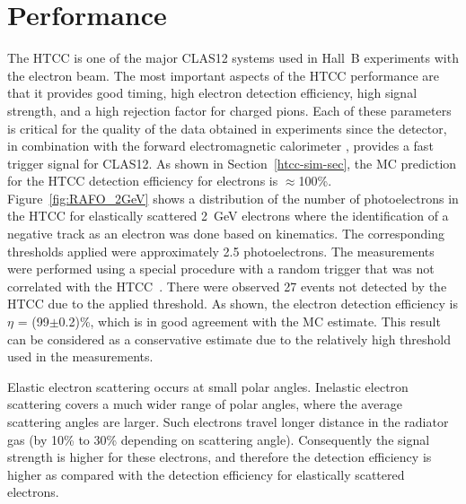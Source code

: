 \section{Performance}

The HTCC is one of the major CLAS12 systems used in Hall~B experiments with the electron beam. The most important
aspects of the HTCC performance are that it provides good timing, high electron detection efficiency, high signal
strength, and a high rejection factor for charged pions. Each of these parameters is critical for the quality of the
data obtained in experiments since the detector, in combination with the forward electromagnetic calorimeter
\cite{ec-nim}, provides a fast trigger signal for CLAS12. As shown in Section~\ref{htcc-sim-sec}, the MC prediction
for the HTCC detection efficiency for electrons is $\approx$100\%. Figure~\ref{fig:RAFO_2GeV} shows a
distribution of the number of photoelectrons in the HTCC for elastically scattered 2~GeV electrons where the
identification of a negative track as an electron was done based on kinematics. The corresponding thresholds applied
were approximately 2.5 photoelectrons. The measurements were performed using a special procedure with a random
trigger that was not correlated with the HTCC~\cite{trigger-nim}. There were observed 27 events not detected by
the HTCC due to the applied threshold. As shown, the electron detection efficiency is $\eta$ = (99$\pm$0.2)\%,
which is in good agreement with the MC estimate. This result can be considered as a conservative estimate due to
the relatively high threshold used in the measurements.

Elastic electron scattering occurs  at small polar angles.  Inelastic electron scattering covers a much wider range of
polar angles, where the average scattering angles are larger. Such electrons travel longer distance in the radiator
gas (by 10\% to 30\% depending on scattering angle). Consequently the signal strength is higher for these electrons,
and therefore the detection efficiency is higher as compared with the detection efficiency for elastically scattered
electrons.  

